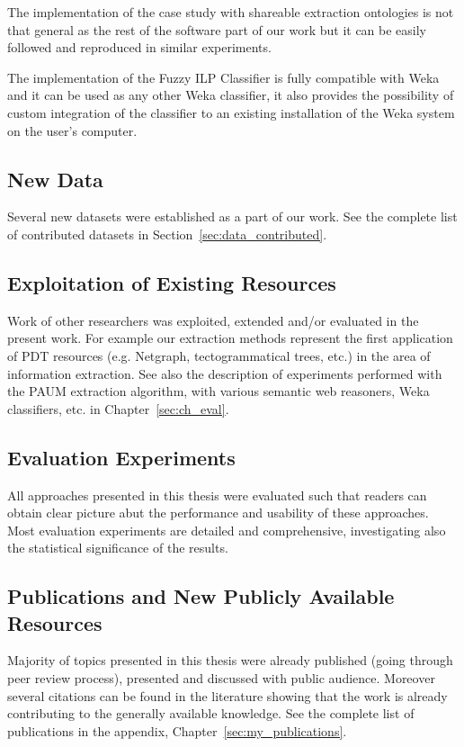 The implementation of the case study with shareable extraction ontologies is not that general as the rest of the software part of our work but it can be easily followed and reproduced in similar experiments.

The implementation of the Fuzzy ILP Classifier is fully compatible with Weka and it can be used as any other Weka classifier, it also provides the possibility of custom integration of the classifier to an existing installation of the Weka system on the user's computer.

\subsection{New Data}

Several new datasets were established as a part of our work. See the complete list of contributed datasets in Section~\ref{sec:data_contributed}.

\subsection{Exploitation of Existing Resources}

Work of other researchers was exploited, extended and/or evaluated in the present work. For example our extraction methods represent the first application of PDT resources (e.g. Netgraph, tectogrammatical trees, etc.) in the area of information extraction. See also the description of experiments performed with the PAUM extraction algorithm, with various semantic web reasoners, Weka classifiers, etc. in Chapter~\ref{sec:ch_eval}.

\subsection{Evaluation Experiments}

All approaches presented in this thesis were evaluated such that readers can obtain clear picture abut the performance and usability of these approaches. Most evaluation experiments are detailed and comprehensive, investigating also the statistical significance of the results.

\subsection{Publications and New Publicly Available Resources}

Majority of topics presented in this thesis were already published (going through peer review process), presented and discussed with public audience. Moreover several citations can be found in the literature showing that the work is already contributing to the generally available knowledge. See the complete list of publications in the appendix, Chapter~\ref{sec:my_publications}.


